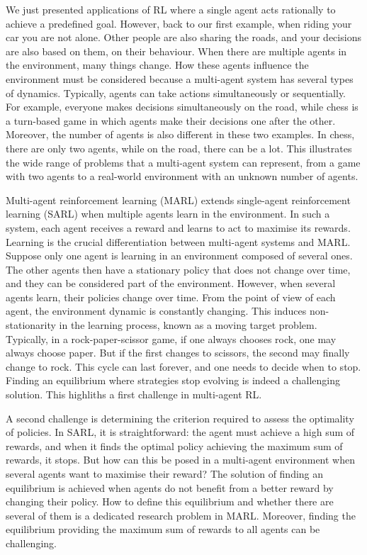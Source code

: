 We just presented applications of RL where a single agent acts rationally to achieve a predefined goal.
However, back to our first example, when riding your car you are not alone.
Other people are also sharing the roads, and your decisions are also based on them, on their behaviour.
When there are multiple agents in the environment, many things change.
How these agents influence the environment must be considered because a multi-agent system has several types of dynamics.
Typically, agents can take actions simultaneously or sequentially.
For example, everyone makes decisions simultaneously on the road, while chess is a turn-based game in which agents make their decisions one after the other.
Moreover, the number of agents is also different in these two examples.
In chess, there are only two agents, while on the road, there can be a lot.
This illustrates the wide range of problems that a multi-agent system can represent, from a game with two agents to a real-world environment with an unknown number of agents.

Multi-agent reinforcement learning (MARL) extends single-agent reinforcement learning (SARL) when multiple agents learn in the environment.
In such a system, each agent receives a reward and learns to act to maximise its rewards. 
Learning is the crucial differentiation between multi-agent systems and MARL.
Suppose only one agent is learning in an environment composed of several ones.
The other agents then have a stationary policy that does not change over time, and they can be considered part of the environment.
However, when several agents learn, their policies change over time.
From the point of view of each agent, the environment dynamic is constantly changing.
This induces non-stationarity in the learning process, known as a moving target problem.
Typically, in a rock-paper-scissor game, if one always chooses rock, one may always choose paper.
But if the first changes to scissors, the second may finally change to rock.
This cycle can last forever, and one needs to decide when to stop.
Finding an equilibrium where strategies stop evolving is indeed a challenging solution.
This highliths a first challenge in multi-agent RL.

A second challenge is determining the criterion required to assess the optimality of policies.
In SARL, it is straightforward: the agent must achieve a high sum of rewards, and when it finds the optimal policy achieving the maximum sum of rewards, it stops.
But how can this be posed in a multi-agent environment when several agents want to maximise their reward?
The solution of finding an equilibrium is achieved when agents do not benefit from a better reward by changing their policy.
How to define this equilibrium and whether there are several of them is a dedicated research problem in MARL.
Moreover, finding the equilibrium providing the maximum sum of rewards to all agents can be challenging.

